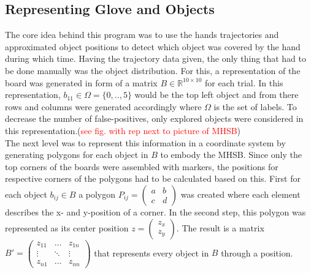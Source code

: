 \subsection{Representing Glove and Objects}
The core idea behind this program was to use the hands trajectories and approximated object positions to detect which object was covered by the hand during which time. Having the trajectory data given, the only thing that had to be done manually was the object distribution. For this, a representation of the board was generated in form of a matrix $B \in \mathbb{R}^{10 \times 10}$ for each trial. In this representation, $b_{11} \in \Omega=\{0,..,5\}$ would be the top left object and from there rows and columns were generated accordingly where $\Omega$ is the set of labels. To decrease the number of false-positives, only explored objects were considered in this representation.(\textcolor{red}{see fig. with rep next to picture of MHSB})\\
The next level was to represent this information in a coordinate system by generating polygons for each object in $ B $ to embody the MHSB. Since only the top corners of the boards were assembled with markers, the positions for respective corners of the polygons had to be calculated based on this. First for each object $ b_{ij} \in B $ a polygon $ P_{ij} = \begin{pmatrix}a & b \\ c & d\end{pmatrix} $ was created where each element describes the x- and y-position of a corner. In the second step, this polygon was represented as its center position $ z = \begin{pmatrix}
z_{x} \\ z_{y}
\end{pmatrix}$. The result is a matrix $B' = \begin{pmatrix}
z_{11} & \hdots & z_{1n} \\
\vdots & \ddots & \vdots \\
z_{n1} & \hdots & z_{nn}
\end{pmatrix}$
that represents every object in $ B $ through a position.\\
\\
